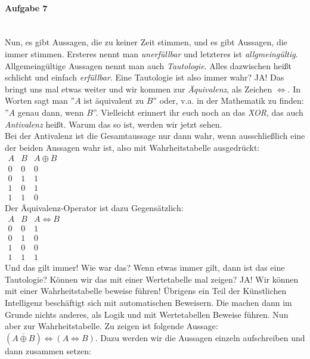 \documentclass[12pt,a4paper,ngerman]{scrartcl}
\begin{document}
	\paragraph{Aufgabe 7}\mbox{}\\
	Nun, es gibt Aussagen, die zu keiner Zeit stimmen, und es gibt Aussagen, die immer stimmen. Ersteres nennt man \emph{unerfüllbar} und letzteres ist \emph{allgmeingültig}. Allgemeingültige Aussagen nennt man auch \emph{Tautologie}. Alles dazwischen heißt schlicht und einfach \emph{erfüllbar}. Eine Tautologie ist also immer wahr? JA! Das bringt uns mal etwas weiter und wir kommen zur \emph{Äquivalenz}, als Zeichen $\Leftrightarrow$. In Worten sagt man ''$A$ ist äquivalent zu $B$'' oder, v.a. in der Mathematik zu finden: ''$A$ genau dann, wenn $B$''. Vielleicht erinnert ihr euch noch an das \emph{XOR}, das auch \emph{Antivalenz} heißt. Warum das so ist, werden wir jetzt sehen.\\
	Bei der Antivalenz ist die Gesamtaussage nur dann wahr, wenn ausschließlich eine der beiden Aussagen wahr ist, also mit Wahrheitstabelle ausgedrückt:\\
	$\begin{array}{cc|c}
	A & B & A \oplus B\\
	\hline
	0 & 0 & 0\\
	0 & 1 & 1\\
	1 & 0 & 1\\
	1 & 1 & 0
	\end{array}$\\
	Der Äquivalenz-Operator ist dazu Gegensätzlich:\\
	$\begin{array}{cc|c}
	A & B & A \Leftrightarrow B\\
	\hline
	0 & 0 & 1\\
	0 & 1 & 0\\
	1 & 0 & 0\\
	1 & 1 & 1
	\end{array}$\\
	Und das gilt immer! Wie war das? Wenn etwas immer gilt, dann ist das eine Tautologie? Können wir das mit einer Wertetabelle mal zeigen? JA! Wir können mit einer Wahrheitstabelle beweise führen! Übrigens ein Teil der Künstlichen Intelligenz beschäftigt sich mit automatischen Beweisern. Die machen dann im Grunde nichts anderes, als Logik und mit Wertetabellen Beweise führen. Nun aber zur Wahrheitstabelle. Zu zeigen ist folgende Aussage: $(\overline{A \oplus B}) \Leftrightarrow (A \Leftrightarrow B)$. Dazu werden wir die Aussagen einzeln aufschreiben und dann zusammen setzen:\\
\end{document}
